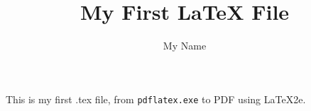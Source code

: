 \documentclass{article}
\title{My First LaTeX File}
\author{My Name}
\date{}
\begin{document}
\maketitle{}

\paragraph{}This is my first .tex file, from \texttt{pdflatex.exe} to PDF using \LaTeX2e{}.
\end{document}
